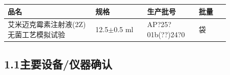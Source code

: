 \documentclass[UTF8,10pt,a4paper,fontset=fandol]{ctexart}
\newcommand{\fieldvalue}[1]{#1}
\newcommand{\handwritten}[1]{#1}
\begin{document}
\begin{center}
\begin{tabular}{|p{0.34\linewidth}|p{0.20\linewidth}|p{0.20\linewidth}|p{0.12\linewidth}|}
\hline
品名 & 规格 & 生产批号 & 批量 \\
\hline
\fieldvalue{艾米迈克霉素注射液(2Z)无菌工艺模拟试验}
&
\fieldvalue{12.5$\pm$0.5 ml}
&
\fieldvalue{\handwritten{AP?25?01b(??)24?0}}
&
\fieldvalue{袋}
\\
\hline
\end{tabular}
\end{center}

\subsection*{1.1\quad 主要设备/仪器确认}
\end{document}
